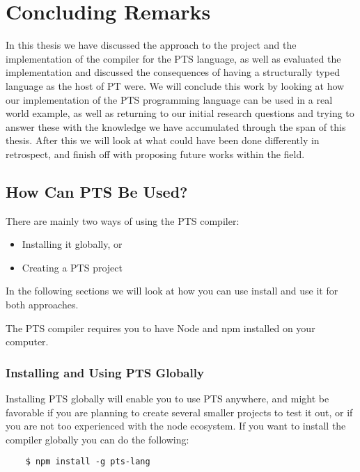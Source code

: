 \chapter{Concluding Remarks}\label{ch:results}

In this thesis we have discussed the approach to the project and the implementation of the compiler for the PTS language, as well as evaluated the implementation and discussed the consequences of having a structurally typed language as the host of PT were.
We will conclude this work by looking at how our implementation of the PTS programming language can be used in a real world example, as well as returning to our initial research questions and trying to answer these with the knowledge we have accumulated through the span of this thesis.
After this we will look at what could have been done differently in retrospect, and finish off with proposing future works within the field.

\section{How Can PTS Be Used?}\label{sec:how-can-this-be-used?}

There are mainly two ways of using the PTS compiler:

\begin{itemize}
    \item Installing it globally, or
    \item Creating a PTS project
\end{itemize}

In the following sections we will look at how you can use install and use it for both approaches.

The PTS compiler requires you to have Node and npm installed on your computer.

\subsection{Installing and Using PTS Globally}\label{subsec:installing-and-using-pts-globally}

Installing PTS globally will enable you to use PTS anywhere, and might be favorable if you are planning to create several smaller projects to test it out, or if you are not too experienced with the node ecosystem.
If you want to install the compiler globally you can do the following:

\begin{verbatim}
    $ npm install -g pts-lang
\end{verbatim}

